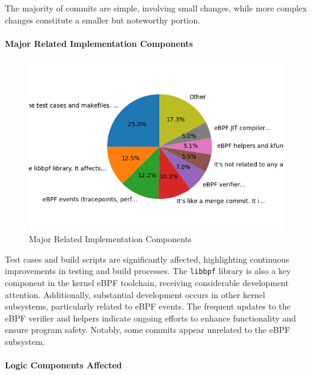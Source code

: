 The majority of commits are simple, involving small changes, while more complex changes constitute a smaller but noteworthy portion.

\paragraph{Major Related Implementation Components}

\begin{figure}[ht]
    \centering
    \includegraphics[width=\linewidth]{feature-analysis/commit_pie_chart_major_implementation_component.png}
    \caption{Major Related Implementation Components}
    \label{fig:commit_pie_chart_major_implementation_component}
\end{figure}

Test cases and build scripts are significantly affected, highlighting continuous improvements in testing and build processes. The \texttt{libbpf} library is also a key component in the kernel eBPF toolchain, receiving considerable development attention. Additionally, substantial development occurs in other kernel subsystems, particularly related to eBPF events. The frequent updates to the eBPF verifier and helpers indicate ongoing efforts to enhance functionality and ensure program safety. Notably, some commits appear unrelated to the eBPF subsystem.

\paragraph{Logic Components Affected}

